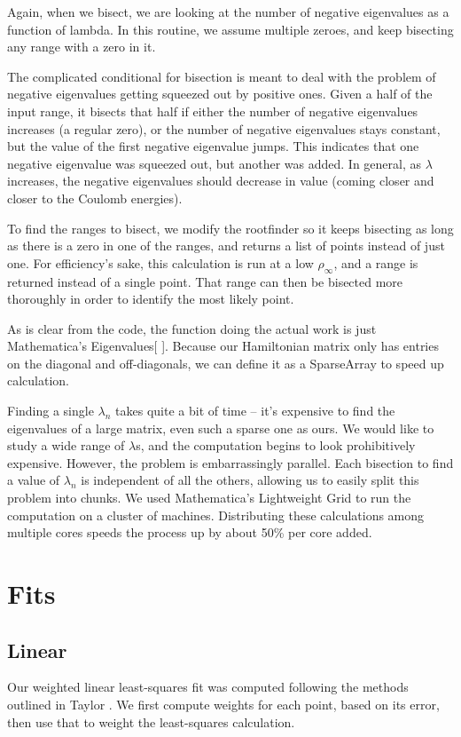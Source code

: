 \documentclass[12pt,twoside]{reedthesis}
\begin{document}
Again, when we bisect, we are looking at the number of negative eigenvalues as a function of lambda. In this routine, we assume multiple zeroes, and keep bisecting any range with a zero in it.

The complicated conditional for bisection is meant to deal with the problem of negative eigenvalues getting squeezed out by positive ones. Given a half of the input range, it bisects that half if either the number of negative eigenvalues increases (a regular zero), or the number of negative eigenvalues stays constant, but the value of the first negative eigenvalue jumps. This indicates that one negative eigenvalue was squeezed out, but another was added. In general, as $\lambda$ increases, the negative eigenvalues should decrease in value (coming closer and closer to the Coulomb energies). 

To find the ranges to bisect, we modify the rootfinder so it keeps bisecting as long as there is a zero in one of the ranges, and returns a list of points instead of just one. For efficiency's sake, this calculation is run at a low $\rho_{\infty}$, and a range is returned instead of a single point. That range can then be bisected more thoroughly in order to identify the most likely point. 

As is clear from the code, the function doing the actual work is just Mathematica's Eigenvalues[ ]. Because our Hamiltonian matrix only has entries on the diagonal and off-diagonals, we can define it as a SparseArray to speed up calculation. 

Finding a single $\lambda_{n}$ takes quite a bit of time -- it's expensive to find the eigenvalues of a large matrix, even such a sparse one as ours. We would like to study a wide range of $\lambda$s, and the computation begins to look prohibitively expensive. However, the problem is embarrassingly parallel. Each bisection to find a value of $\lambda_n$ is independent of all the others, allowing us to easily split this problem into chunks. We used Mathematica's Lightweight Grid to run the computation on a cluster of machines. Distributing these calculations among multiple cores speeds the process up by about 50\% per core added. 

\section{Fits}
\subsection{Linear}
Our weighted linear least-squares fit was computed following the methods outlined in Taylor \cite{taylor_introduction_1997}. We first compute weights for each point, based on its error, then use that to weight the least-squares calculation.
\end{document}
